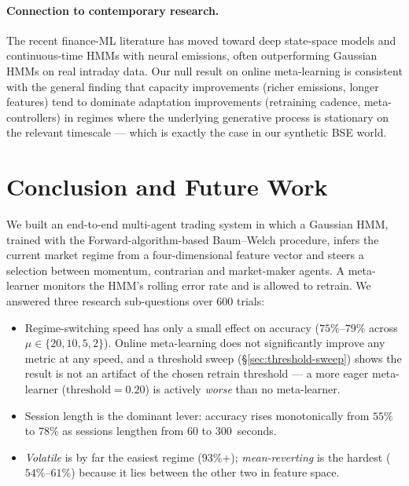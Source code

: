 \documentclass[11pt,a4paper]{article}
\begin{document}
\paragraph{Connection to contemporary research.}
The recent finance-ML literature has moved toward deep state-space models
\cite{zheng2019dlhmm} and continuous-time HMMs with neural emissions, often
outperforming Gaussian HMMs on real intraday data. Our null result on online
meta-learning is consistent with the general finding that capacity
improvements (richer emissions, longer features) tend to dominate
adaptation improvements (retraining cadence, meta-controllers) in regimes
where the underlying generative process is stationary on the relevant
timescale --- which is exactly the case in our synthetic BSE world.


\section{Conclusion and Future Work}\label{sec:conclusion}

We built an end-to-end multi-agent trading system in which a Gaussian HMM,
trained with the Forward-algorithm-based Baum--Welch procedure, infers the
current market regime from a four-dimensional feature vector and steers a
selection between momentum, contrarian and market-maker agents. A
meta-learner monitors the HMM's rolling error rate and is allowed to
retrain. We answered three research sub-questions over 600 trials:

\begin{itemize}[leftmargin=0.7cm,itemsep=0.1ex]
    \item[\textbf{RQ1.}] Regime-switching speed has only a small effect
    on accuracy ($75\%$--$79\%$ across $\mu \in \{20,10,5,2\}$). Online
    meta-learning does not significantly improve any metric at any speed,
    and a threshold sweep (\S\ref{sec:threshold-sweep}) shows the result is
    not an artifact of the chosen retrain threshold --- a more eager
    meta-learner ($\text{threshold}=0.20$) is actively \emph{worse} than
    no meta-learner.
    \item[\textbf{RQ2.}] Session length is the dominant lever: accuracy
    rises monotonically from $55\%$ to $78\%$ as sessions lengthen from
    $60$ to $300$~seconds.
    \item[\textbf{RQ3.}] \emph{Volatile} is by far the easiest regime
    ($93\%$+); \emph{mean-reverting} is the hardest ($54\%$--$61\%$) because
    it lies between the other two in feature space.
\end{itemize}
\end{document}
